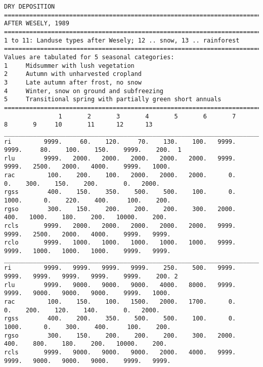 \documentclass{egu}            %
\begin{document}
\begin{scriptsize}\begin{verbatim}
DRY DEPOSITION
==============================================================================
AFTER WESELY, 1989
==============================================================================
1 to 11: Landuse types after Wesely; 12 .. snow, 13 .. rainforest
==============================================================================
Values are tabulated for 5 seasonal categories:
1     Midsummer with lush vegetation
2     Autumn with unharvested cropland
3     Late autumn after frost, no snow
4     Winter, snow on ground and subfreezing
5     Transitional spring with partially green short annuals
==============================================================================
               1       2       3       4       5       6       7       8       9     10       11      12      13  
________________________________________________________________________________________________________________
ri         9999.     60.    120.     70.    130.    100.   9999.   9999.     80.    100.    150.    9999.    200.  1
rlu        9999.   2000.   2000.   2000.   2000.   2000.   9999.   9999.   2500.   2000.   4000.    9999.   1000.
rac         100.    200.    100.   2000.   2000.   2000.      0.      0.    300.    150.    200.       0.   2000.
rgss        400.    150.    350.    500.    500.    100.      0.   1000.      0.    220.    400.     100.    200.
rgso        300.    150.    200.    200.    200.    300.   2000.    400.   1000.    180.    200.   10000.    200.
rcls       9999.   2000.   2000.   2000.   2000.   2000.   9999.   9999.   2500.   2000.   4000.    9999.   9999.
rclo       9999.   1000.   1000.   1000.   1000.   1000.   9999.   9999.   1000.   1000.   1000.    9999.   9999.
_________________________________________________________________________________________________________________
ri         9999.   9999.   9999.   9999.    250.    500.   9999.   9999.   9999.   9999.   9999.    9999.    200. 2
rlu        9999.   9000.   9000.   9000.   4000.   8000.   9999.   9999.   9000.   9000.   9000.    9999.   1000.
rac         100.    150.    100.   1500.   2000.   1700.      0.      0.    200.    120.    140.       0.   2000.
rgss        400.    200.    350.    500.    500.    100.      0.   1000.      0.    300.    400.     100.    200.
rgso        300.    150.    200.    200.    200.    300.   2000.    400.    800.    180.    200.   10000.    200.
rcls       9999.   9000.   9000.   9000.   2000.   4000.   9999.   9999.   9000.   9000.   9000.    9999.   9999.

\end{verbatim}
\end{scriptsize}
\end{document}
